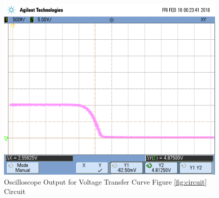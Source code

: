 \FloatBarrier
\begin{figure}[h!]
	\centering
	\includegraphics[scale=0.40]{./images/scope_0}
	\caption{Oscilloscope Output for Voltage Transfer Curve Figure \ref{fig:circuit} Circuit}
	\label{fig:vtc_result}
\end{figure}
\FloatBarrier
